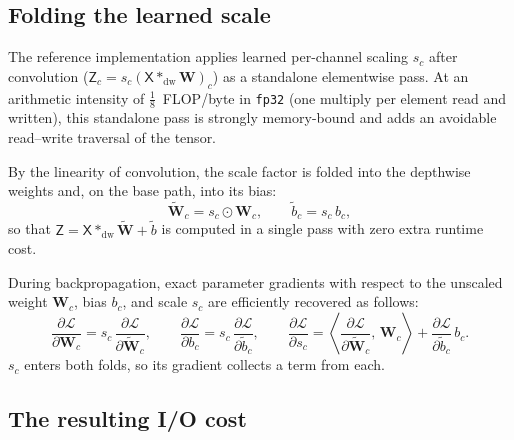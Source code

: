 \documentclass[10pt]{article} %
\newcommand{\tX}{\mathsf{X}}
\newcommand{\tZ}{\mathsf{Z}}
\newcommand{\mW}{\mathbf{W}}
\newcommand{\dwconv}{\mathbin{\ast_{\mathrm{dw}}}}
\theoremstyle{plain}
\begin{document}
\subsection{Folding the learned scale}
\label{sec:scale_folding}

The reference implementation applies learned per-channel scaling $s_c$ after convolution ($\tZ_c = s_c (\tX \dwconv \mW)_c$) as a standalone elementwise pass. At an arithmetic intensity of $\tfrac18$~FLOP/byte in \texttt{fp32} (one multiply per element read and written), this standalone pass is strongly memory-bound and adds an avoidable read--write traversal of the tensor.

By the linearity of convolution, the scale factor is folded into the depthwise weights and, on the base path, into its bias:
\begin{equation}
\widetilde{\mW}_c = s_c \odot \mW_c, \qquad \widetilde{b}_c = s_c\, b_c,
\label{eq:fold}
\end{equation}
so that $\tZ = \tX \dwconv \widetilde{\mW} + \widetilde{b}$ is computed in a single pass with zero extra runtime cost.

During backpropagation, exact parameter gradients with respect to the unscaled weight $\mW_c$, bias $b_c$, and scale $s_c$ are efficiently recovered as follows:
\begin{equation}
\frac{\partial\mathcal{L}}{\partial\mW_c} = s_c \, \frac{\partial\mathcal{L}}{\partial\widetilde{\mW}_c}, \qquad
\frac{\partial\mathcal{L}}{\partial b_c} = s_c \, \frac{\partial\mathcal{L}}{\partial\widetilde{b}_c}, \qquad
\frac{\partial\mathcal{L}}{\partial s_c} = \left\langle \frac{\partial\mathcal{L}}{\partial\widetilde{\mW}_c}, \, \mW_c \right\rangle + \frac{\partial\mathcal{L}}{\partial\widetilde{b}_c}\, b_c.
\label{eq:foldgrad}
\end{equation}
$s_c$ enters both folds, so its gradient collects a term from each.

\subsection{The resulting I/O cost}
\label{sec:prediction}
\end{document}

